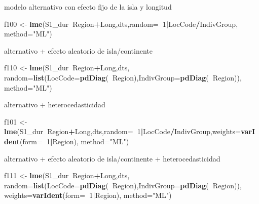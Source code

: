 \documentclass[]{article}
\newenvironment{Shaded}{\begin{snugshade}}{\end{snugshade}}
\newcommand{\DataTypeTok}[1]{\textcolor[rgb]{0.13,0.29,0.53}{#1}}
\newcommand{\DecValTok}[1]{\textcolor[rgb]{0.00,0.00,0.81}{#1}}
\newcommand{\KeywordTok}[1]{\textcolor[rgb]{0.13,0.29,0.53}{\textbf{#1}}}
\newcommand{\NormalTok}[1]{#1}
\newcommand{\OperatorTok}[1]{\textcolor[rgb]{0.81,0.36,0.00}{\textbf{#1}}}
\newcommand{\StringTok}[1]{\textcolor[rgb]{0.31,0.60,0.02}{#1}}
\begin{document}
modelo alternativo con efecto fijo de la isla y longitud

\begin{Shaded}
\begin{Highlighting}[]
\NormalTok{f100 <-}\StringTok{ }\KeywordTok{lme}\NormalTok{(S1_dur}\OperatorTok{~}\NormalTok{Region}\OperatorTok{+}\NormalTok{Long,dts,}\DataTypeTok{random=}\OperatorTok{~}\DecValTok{1}\OperatorTok{|}\NormalTok{LocCode}\OperatorTok{/}\NormalTok{IndivGroup, }\DataTypeTok{method=}\StringTok{"ML"}\NormalTok{)}
\end{Highlighting}
\end{Shaded}

alternativo + efecto aleatorio de isla/continente

\begin{Shaded}
\begin{Highlighting}[]
\NormalTok{f110 <-}\StringTok{ }\KeywordTok{lme}\NormalTok{(S1_dur}\OperatorTok{~}\NormalTok{Region}\OperatorTok{+}\NormalTok{Long,dts,}
     \DataTypeTok{random=}\KeywordTok{list}\NormalTok{(}\DataTypeTok{LocCode=}\KeywordTok{pdDiag}\NormalTok{(}\OperatorTok{~}\NormalTok{Region),}\DataTypeTok{IndivGroup=}\KeywordTok{pdDiag}\NormalTok{(}\OperatorTok{~}\NormalTok{Region)), }\DataTypeTok{method=}\StringTok{"ML"}\NormalTok{)}
\end{Highlighting}
\end{Shaded}

alternativo + heterocedasticidad

\begin{Shaded}
\begin{Highlighting}[]
\NormalTok{f101 <-}\StringTok{ }\KeywordTok{lme}\NormalTok{(S1_dur}\OperatorTok{~}\NormalTok{Region}\OperatorTok{+}\NormalTok{Long,dts,}\DataTypeTok{random=}\OperatorTok{~}\DecValTok{1}\OperatorTok{|}\NormalTok{LocCode}\OperatorTok{/}\NormalTok{IndivGroup,}\DataTypeTok{weights=}\KeywordTok{varIdent}\NormalTok{(}\DataTypeTok{form=}\OperatorTok{~}\DecValTok{1}\OperatorTok{|}\NormalTok{Region), }\DataTypeTok{method=}\StringTok{"ML"}\NormalTok{)}
\end{Highlighting}
\end{Shaded}

alternativo + efecto aleatorio de isla/continente + heterocedasticidad

\begin{Shaded}
\begin{Highlighting}[]
\NormalTok{f111 <-}
\StringTok{      }\KeywordTok{lme}\NormalTok{(S1_dur}\OperatorTok{~}\NormalTok{Region}\OperatorTok{+}\NormalTok{Long,dts,}
        \DataTypeTok{random=}\KeywordTok{list}\NormalTok{(}\DataTypeTok{LocCode=}\KeywordTok{pdDiag}\NormalTok{(}\OperatorTok{~}\NormalTok{Region),}\DataTypeTok{IndivGroup=}\KeywordTok{pdDiag}\NormalTok{(}\OperatorTok{~}\NormalTok{Region)),}
        \DataTypeTok{weights=}\KeywordTok{varIdent}\NormalTok{(}\DataTypeTok{form=}\OperatorTok{~}\DecValTok{1}\OperatorTok{|}\NormalTok{Region), }\DataTypeTok{method=}\StringTok{"ML"}\NormalTok{)}
\end{Highlighting}
\end{Shaded}
\end{document}
